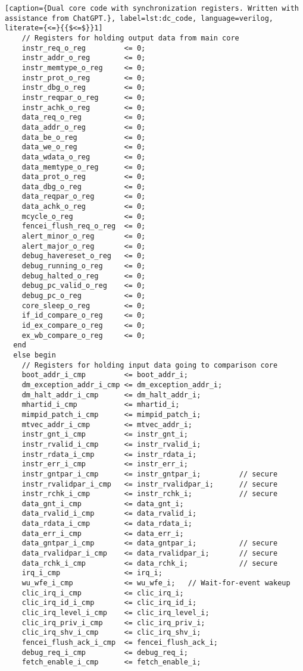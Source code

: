\begin{lstlisting}[caption={Dual core code with synchronization registers. Written with assistance from ChatGPT.}, label=lst:dc_code, language=verilog, literate={<=}{{$<=$}}1]
    // Registers for holding output data from main core 
    instr_req_o_reg         <= 0;
    instr_addr_o_reg        <= 0;
    instr_memtype_o_reg     <= 0;
    instr_prot_o_reg        <= 0;
    instr_dbg_o_reg         <= 0;
    instr_reqpar_o_reg      <= 0;
    instr_achk_o_reg        <= 0;
    data_req_o_reg          <= 0;  
    data_addr_o_reg         <= 0;
    data_be_o_reg           <= 0;
    data_we_o_reg           <= 0;
    data_wdata_o_reg        <= 0;
    data_memtype_o_reg      <= 0;
    data_prot_o_reg         <= 0;
    data_dbg_o_reg          <= 0;
    data_reqpar_o_reg       <= 0;
    data_achk_o_reg         <= 0;
    mcycle_o_reg            <= 0;
    fencei_flush_req_o_reg  <= 0;
    alert_minor_o_reg       <= 0;
    alert_major_o_reg       <= 0;
    debug_havereset_o_reg   <= 0;
    debug_running_o_reg     <= 0;
    debug_halted_o_reg      <= 0;
    debug_pc_valid_o_reg    <= 0;
    debug_pc_o_reg          <= 0;
    core_sleep_o_reg        <= 0;
    if_id_compare_o_reg     <= 0;
    id_ex_compare_o_reg     <= 0;
    ex_wb_compare_o_reg     <= 0;
  end
  else begin
    // Registers for holding input data going to comparison core
    boot_addr_i_cmp         <= boot_addr_i;
    dm_exception_addr_i_cmp <= dm_exception_addr_i;
    dm_halt_addr_i_cmp      <= dm_halt_addr_i;
    mhartid_i_cmp           <= mhartid_i;
    mimpid_patch_i_cmp      <= mimpid_patch_i;
    mtvec_addr_i_cmp        <= mtvec_addr_i;
    instr_gnt_i_cmp         <= instr_gnt_i;
    instr_rvalid_i_cmp      <= instr_rvalid_i;
    instr_rdata_i_cmp       <= instr_rdata_i;
    instr_err_i_cmp         <= instr_err_i;
    instr_gntpar_i_cmp      <= instr_gntpar_i;         // secure
    instr_rvalidpar_i_cmp   <= instr_rvalidpar_i;      // secure
    instr_rchk_i_cmp        <= instr_rchk_i;           // secure
    data_gnt_i_cmp          <= data_gnt_i;
    data_rvalid_i_cmp       <= data_rvalid_i;
    data_rdata_i_cmp        <= data_rdata_i;
    data_err_i_cmp          <= data_err_i;
    data_gntpar_i_cmp       <= data_gntpar_i;          // secure
    data_rvalidpar_i_cmp    <= data_rvalidpar_i;       // secure
    data_rchk_i_cmp         <= data_rchk_i;            // secure
    irq_i_cmp               <= irq_i;
    wu_wfe_i_cmp            <= wu_wfe_i;   // Wait-for-event wakeup
    clic_irq_i_cmp          <= clic_irq_i;
    clic_irq_id_i_cmp       <= clic_irq_id_i;
    clic_irq_level_i_cmp    <= clic_irq_level_i;
    clic_irq_priv_i_cmp     <= clic_irq_priv_i;
    clic_irq_shv_i_cmp      <= clic_irq_shv_i;
    fencei_flush_ack_i_cmp  <= fencei_flush_ack_i;
    debug_req_i_cmp         <= debug_req_i;
    fetch_enable_i_cmp      <= fetch_enable_i;
 

\end{lstlisting}
